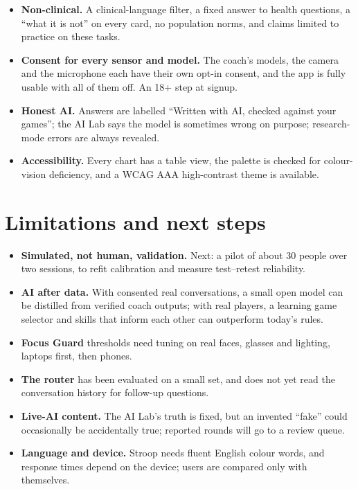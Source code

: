 \documentclass[11pt,a4paper]{article}
\begin{document}
\begin{itemize}
\item \textbf{Non-clinical.} A clinical-language filter, a fixed answer to health questions, a ``what it is not'' on every card, no population norms, and claims limited to practice on these tasks.
\item \textbf{Consent for every sensor and model.} The coach's models, the camera and the microphone each have their own opt-in consent, and the app is fully usable with all of them off. An 18+ step at signup.
\item \textbf{Honest AI.} Answers are labelled ``Written with AI, checked against your games''; the AI Lab says the model is sometimes wrong on purpose; research-mode errors are always revealed.
\item \textbf{Accessibility.} Every chart has a table view, the palette is checked for colour-vision deficiency, and a WCAG AAA high-contrast theme is available.
\end{itemize}

\section{Limitations and next steps}
\label{sec:limits}

\begin{itemize}
\item \textbf{Simulated, not human, validation.} Next: a pilot of about 30 people over two sessions, to refit calibration and measure test--retest reliability.
\item \textbf{AI after data.} With consented real conversations, a small open model can be distilled from verified coach outputs; with real players, a learning game selector and skills that inform each other can outperform today's rules.
\item \textbf{Focus Guard} thresholds need tuning on real faces, glasses and lighting, laptops first, then phones.
\item \textbf{The router} has been evaluated on a small set, and does not yet read the conversation history for follow-up questions.
\item \textbf{Live-AI content.} The AI Lab's truth is fixed, but an invented ``fake'' could occasionally be accidentally true; reported rounds will go to a review queue.
\item \textbf{Language and device.} Stroop needs fluent English colour words, and response times depend on the device; users are compared only with themselves.
\end{itemize}
\end{document}
